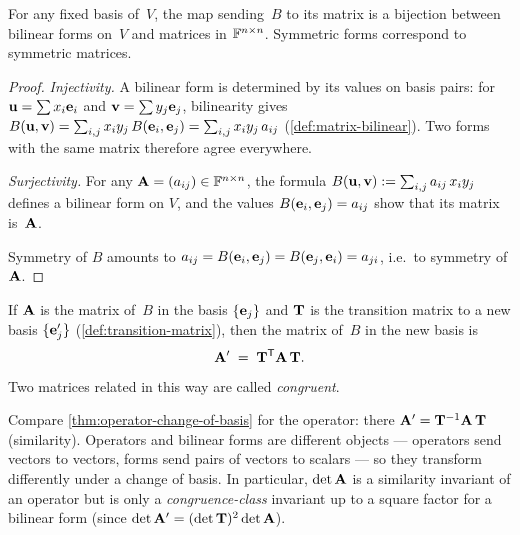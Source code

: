 \begin{theorem}
\label{thm:bilinear-matrix-bijection}
For any fixed basis of~$V$, the map sending~$B$ to its matrix is a
bijection between bilinear forms on~$V$ and matrices in
$\mathbb{F}^{n \times n}$. Symmetric forms correspond to symmetric matrices.
\end{theorem}
\begin{proof}
\emph{Injectivity.} A bilinear form is determined by its values on
basis pairs: for $\mathbf{u} = \sum x_i \mathbf{e}_i$ and
$\mathbf{v} = \sum y_j \mathbf{e}_j$, bilinearity gives
$B(\mathbf{u}, \mathbf{v}) = \sum_{i, j} x_i y_j\, B(\mathbf{e}_i, \mathbf{e}_j)
= \sum_{i, j} x_i y_j\, a_{ij}$
(\cref{def:matrix-bilinear}). Two forms with the same matrix therefore
agree everywhere.

\emph{Surjectivity.} For any $\mathbf{A} = (a_{ij}) \in \mathbb{F}^{n \times n}$,
the formula
$B(\mathbf{u}, \mathbf{v}) := \sum_{i, j} a_{ij}\, x_i y_j$
defines a bilinear form on $V$, and the values
$B(\mathbf{e}_i, \mathbf{e}_j) = a_{ij}$ show that its matrix is~$\mathbf{A}$.

Symmetry of $B$ amounts to
$a_{ij} = B(\mathbf{e}_i, \mathbf{e}_j) = B(\mathbf{e}_j, \mathbf{e}_i) = a_{ji}$,
i.e.\ to symmetry of $\mathbf{A}$.
\end{proof}

\begin{theorem}
\label{thm:bilinear-change-of-basis}
If $\mathbf{A}$ is the matrix of~$B$ in the basis $\{\mathbf{e}_j\}$ and
$\mathbf{T}$ is the transition matrix to a new basis $\{\mathbf{e}'_j\}$
(\cref{def:transition-matrix}), then the matrix of~$B$ in the new
basis is
\[
  \mathbf{A}' \;=\; \mathbf{T}^{\mathsf{T}} \mathbf{A}\, \mathbf{T}.
\]
Two matrices related in this way are called \emph{congruent}.
\end{theorem}

\begin{remark}
Compare \cref{thm:operator-change-of-basis} for the operator: there
$\mathbf{A}' = \mathbf{T}^{-1} \mathbf{A}\, \mathbf{T}$ (similarity). Operators
and bilinear forms are different objects --- operators send vectors to
vectors, forms send pairs of vectors to scalars --- so they
transform differently under a change of basis. In particular, $\det \mathbf{A}$
is a similarity invariant of an operator but is only a
\emph{congruence-class} invariant up to a square factor for a bilinear
form (since $\det \mathbf{A}' = (\det \mathbf{T})^2 \det \mathbf{A}$).
\end{remark}

